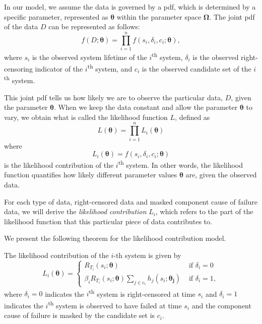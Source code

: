 \documentclass[
]{article}
\begin{document}
In our model, we assume the data is governed by a pdf, which is
determined by a specific parameter, represented as
\(\boldsymbol{\theta}\) within the parameter space
\(\boldsymbol{\Omega}\). The joint pdf of the data \(D\) can be
represented as follows: \[
f(D ; \boldsymbol{\theta}) = \prod_{i=1}^n f(s_i,\delta_i,c_i;\boldsymbol{\theta}),
\] where \(s_i\) is the observed system lifetime of the
\(i\)\textsuperscript{th} system, \(\delta_i\) is the observed
right-censoring indicator of the \(i\)\textsuperscript{th} system, and
\(c_i\) is the observed candidate set of the \(i\)\textsuperscript{th}
system.

This joint pdf tells us how likely we are to observe the particular
data, \(D\), given the parameter \(\boldsymbol{\theta}\). When we keep
the data constant and allow the parameter \(\boldsymbol{\theta}\) to
vary, we obtain what is called the likelihood function \(L\), defined as
\[
L(\boldsymbol{\theta}) = \prod_{i=1}^n L_i(\boldsymbol{\theta})
\] where \[
L_i(\boldsymbol{\theta}) = f(s_i,\delta_i,c_i;\boldsymbol{\theta})
\] is the likelihood contribution of the \(i\)\textsuperscript{th}
system. In other words, the likelihood function quantifies how likely
different parameter values \(\boldsymbol{\theta}\) are, given the
observed data.

For each type of data, right-censored data and masked component cause of
failure data, we will derive the \emph{likelihood contribution} \(L_i\),
which refers to the part of the likelihood function that this particular
piece of data contributes to.

We present the following theorem for the likelihood contribution model.

\begin{theorem}
\label{thm:likelihood_contribution}
The likelihood contribution of the $i$-th system is given by
\begin{equation}
\label{eq:like}
L_i(\boldsymbol{\theta}) =
\begin{cases}
    R_{T_i}(s_i;\boldsymbol{\theta})                      &\text{ if } \delta_i = 0\\
    \beta_i R_{T_i}(s_i;\boldsymbol{\theta})
        \sum_{j\in c_i} h_j(s_i;\boldsymbol{\theta_j})   &\text{ if } \delta_i = 1,
\end{cases}
\end{equation}
where $\delta_i = 0$ indicates the $i$\textsuperscript{th} system is
right-censored at time $s_i$ and $\delta_i = 1$ indicates the $i$\textsuperscript{th} system
is observed to have failed at time $s_i$ and the component cause of failure
is masked by the candidate set is $c_i$.
\end{theorem}
\end{document}

